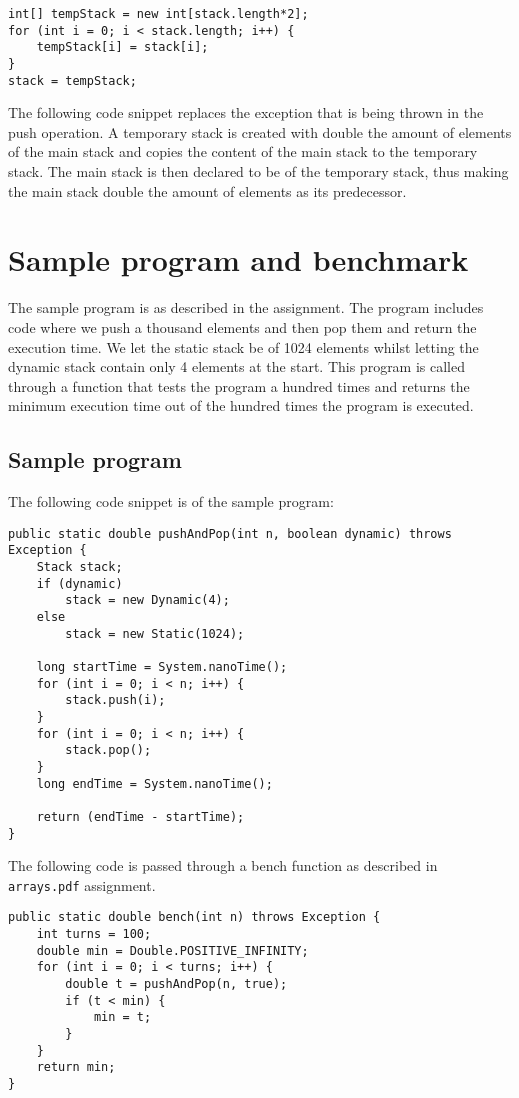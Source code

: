 \documentclass[a4paper,11pt]{article}
\begin{document}
\begin{verbatim}
int[] tempStack = new int[stack.length*2];
for (int i = 0; i < stack.length; i++) {
    tempStack[i] = stack[i];
}
stack = tempStack;
\end{verbatim}
    The following code snippet replaces the exception that is being thrown in the push operation. A temporary stack is created with double the amount of elements of the main stack and copies the content of the main stack to the temporary stack. The main stack is then declared to be of the temporary stack, thus making the main stack double the amount of elements as its predecessor. 
    
\section*{Sample program and benchmark}

    The sample program is as described in the assignment. The program includes code where we push a thousand elements and then pop them and return the execution time. We let the static stack be of 1024 elements whilst letting the dynamic stack contain only 4 elements at the start. This program is called through a function that tests the program a hundred times and returns the minimum execution time out of the hundred times the program is executed.

\subsection*{Sample program}

    The following code snippet is of the sample program:

\begin{verbatim}
public static double pushAndPop(int n, boolean dynamic) throws Exception {
    Stack stack;
    if (dynamic)
        stack = new Dynamic(4);
    else
        stack = new Static(1024);
        
    long startTime = System.nanoTime();
    for (int i = 0; i < n; i++) {
        stack.push(i);
    }
    for (int i = 0; i < n; i++) {
        stack.pop();
    }
    long endTime = System.nanoTime();
    
    return (endTime - startTime);
}    
\end{verbatim}

    The following code is passed through a bench function as described in \texttt{arrays.pdf} assignment.

\begin{verbatim}
public static double bench(int n) throws Exception {
    int turns = 100;
    double min = Double.POSITIVE_INFINITY;
    for (int i = 0; i < turns; i++) {
        double t = pushAndPop(n, true);
        if (t < min) {
            min = t;
        }
    }
    return min;
}
\end{verbatim}    
\end{document}
